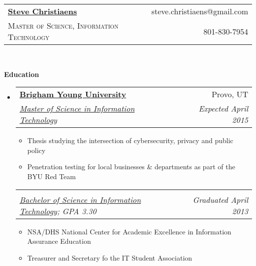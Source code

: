 \documentclass[letterpaper,11pt]{article}
\makeatletter
\newcommand{\resitem}[1]{\item #1 \vspace{-2pt}}
\newcommand{\resheading}[1]{{\large \colorbox{mygrey}{\begin{minipage}{\textwidth}{\textbf{#1 \vphantom{p\^{E}}}}\end{minipage}}}}
\newcommand{\ressubheading}[4]{
\begin{tabular*}{6.5in}{l@{\extracolsep{\fill}}r}
		\textbf{#1} & #2 \\
		\textit{#3} & \textit{#4} \\
\end{tabular*}\vspace{-6pt}}
\makeatother
\begin{document}
\newcommand{\mywebheader}{
\begin{tabular*}{7in}{l@{\extracolsep{\fill}}r}
	\textbf{\href{}{\LARGE Steve Christiaens}} & %
	{steve.christiaens@gmail.com}\\
	{\footnotesize \textsc{Master of Science, Information Technology}} & {801-830-7954} \\
	\end{tabular*}
\\
\vspace{0.1in}}

\mywebheader

\resheading{Education}
	\begin{itemize}
		\item
			\ressubheading{\href{}{Brigham Young University}}{Provo, UT}{\href{}{Master of Science in Information Technology} \href{}{}}{Expected April 2015}
			{ \footnotesize
				\begin{itemize}
					\resitem{Thesis studying the intersection of cybersecurity, privacy and public policy}
					\resitem{Penetration testing for local businesses \& departments as part of the BYU Red Team} 
				\end{itemize}
			}				
			\vspace{-15pt} %
			\ressubheading{\href{}{}}{}{\href{}{Bachelor of Science in Information Technology}; {GPA 3.30} \href{}{}}{Graduated April 2013}
				{ \footnotesize
					\begin{itemize}
						\resitem{NSA/DHS National Center for Academic Excellence in Information Assurance Education}
						\resitem{Treasurer and Secretary fo the IT Student Association} 
					\end{itemize}
				}
	\end{itemize} %
\end{document}
